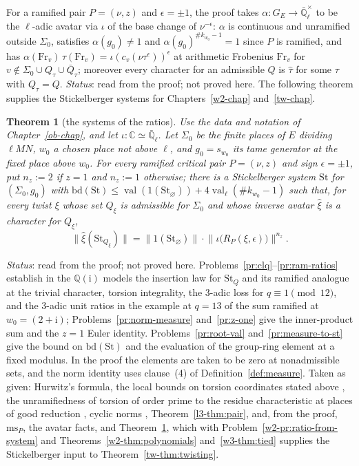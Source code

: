\documentclass[reqno]{amsart}
\newcounter{chap}
\theoremstyle{definition}
\theoremstyle{plain}
\newtheorem{theorem}{Theorem}[section]
\theoremstyle{remark}
\newcommand{\Q}{\mathbb{Q}}
\newcommand{\C}{\mathbb{C}}
\newcommand{\Ql}{\bar{\mathbb{Q}}_\ell}
\newcommand{\ii}{\mathrm{i}}
\newcommand{\St}{\mathrm{St}}
\newcommand{\bd}{\mathrm{bd}}
\newcommand{\ms}{\mathrm{ms}}
\newcommand{\Fr}{\mathrm{Fr}}
\newcommand{\val}{\operatorname{val}}
\begin{document}
For a ramified pair \(P = (\nu, z)\) and \(\epsilon = \pm 1\), the proof takes \(\alpha \colon G_E \to \Ql^\times\) to be the \(\ell\)-adic avatar via \(\iota\) of the base change of \(\nu^{-\epsilon}\): \(\alpha\) is continuous and unramified outside \(\Sigma_0\), satisfies \(\alpha(g_0) \ne 1\) and \(\alpha(g_0)^{\#k_{w_0} - 1} = 1\) since \(P\) is ramified, and has \(\alpha(\Fr_v)\,\hat\tau(\Fr_v) = \iota(c_v(\nu\tau^{\epsilon}))^{\epsilon}\) at arithmetic Frobenius \(\Fr_v\) for \(v \notin \Sigma_0 \cup Q_\tau \cup \bar Q_\tau\); moreover every character for an admissible \(Q\) is \(\hat\tau\) for some \(\tau\) with \(Q_\tau = Q\).  \emph{Status}: read from the proof; not proved here.  The following theorem supplies the Stickelberger systems for Chapters~\ref{w2-chap} and~\ref{tw-chap}.

\begin{theorem}[the systems of the ratios]\label{thm:pair-system}
Use the data and notation of Chapter~\ref{ob-chap}, and let \(\iota \colon \C \simeq \Ql\).  Let \(\Sigma_0\) be the finite places of \(E\) dividing \(\ell MN\), \(w_0\) a chosen place not above \(\ell\), and \(g_0 = s_{w_0}\) its tame generator at the fixed place above \(w_0\).  For every ramified critical pair \(P = (\nu, z)\) and sign \(\epsilon = \pm 1\), put \(n_z := 2\) if \(z = 1\) and \(n_z := 1\) otherwise; there is a Stickelberger system \(\St\) for \((\Sigma_0, g_0)\) with \(\bd(\St) \le \val(1(\St_\varnothing)) + 4\val_\ell(\#k_{w_0} - 1)\) such that, for every twist \(\xi\) whose set \(Q_\xi\) is admissible for \(\Sigma_0\) and whose inverse avatar \(\hat\xi\) is a character for \(Q_\xi\),
\[
  \bigl\lVert \hat\xi(\St_{Q_\xi}) \bigr\rVert = \bigl\lVert 1(\St_\varnothing) \bigr\rVert \cdot \bigl\lVert \iota\bigl(R_P(\xi, \epsilon)\bigr) \bigr\rVert^{n_z} .
\]
\end{theorem}

\emph{Status}: read from the proof; not proved here.  Problems~\ref{pr:clq}--\ref{pr:ram-ratios} establish in the \(\Q(\ii)\) models the insertion law for \(\St_Q\) and its ramified analogue at the trivial character, torsion integrality, the \(3\)-adic loss for \(q \equiv 1 \pmod{12}\), and the \(3\)-adic unit ratios in the example at \(q = 13\) of the sum ramified at \(w_0 = (2 + \ii)\); Problems~\ref{pr:norm-measure} and~\ref{pr:z-one} give the inner-product sum and the \(z = 1\) Euler identity.  Problems~\ref{pr:root-val} and~\ref{pr:measure-to-st} give the bound on \(\bd(\St)\) and the evaluation of the group-ring element at a fixed modulus.  In the proof the elements are taken to be zero at nonadmissible sets, and the norm identity uses clause~(4) of Definition~\ref{def:measure}.  Taken as given: Hurwitz's formula, the local bounds on torsion coordinates stated above \cite[Thm.~VII.3.4]{Si1}, the unramifiedness of torsion of order prime to the residue characteristic at places of good reduction \cite[Prop.~VII.4.1]{Si1}, cyclic norms \cite{La}, Theorem~\ref{l3-thm:pair}, and, from the proof, \(\ms_P\), the avatar facts, and Theorem~\ref{thm:pair-system}, which with Problem~\ref{w2-pr:ratio-from-system} and Theorems~\ref{w2-thm:polynomials} and~\ref{w3-thm:tied} supplies the Stickelberger input to Theorem~\ref{tw-thm:twisting}.
\end{document}
